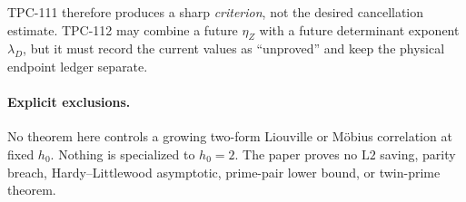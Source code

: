 \documentclass[11pt,a4paper]{article}
\theoremstyle{definition}
\theoremstyle{remark}
\newcommand{\Ltwo}{\mathrm{L2}}
\begin{document}
TPC-111 therefore produces a sharp \emph{criterion}, not the desired
cancellation estimate.  TPC-112 may combine a future
\(\eta_Z\) with a future determinant exponent \(\lambda_D\), but it
must record the current values as ``unproved'' and keep the physical
endpoint ledger separate.

\paragraph{Explicit exclusions.}
No theorem here controls a growing two-form Liouville or M\"obius
correlation at fixed \(h_0\).  Nothing is specialized to \(h_0=2\).
The paper proves no \(\Ltwo\) saving, parity breach,
Hardy--Littlewood asymptotic, prime-pair lower bound, or twin-prime
theorem.

\begingroup
\sloppy


\endgroup
\end{document}
